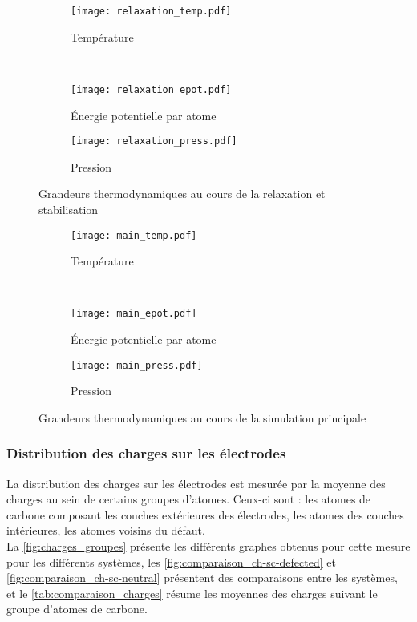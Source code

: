 \begin{figure}[h!]
    \centering
    \begin{subfigure}[t]{.49 \textwidth}
        \centering
        \texttt{[image: relaxation\_temp.pdf]}
        \caption{Température}
    \end{subfigure}%
    ~
    \begin{subfigure}[t]{.49 \textwidth}
        \centering
        \texttt{[image: relaxation\_epot.pdf]}
        \caption{Énergie potentielle par atome}
    \end{subfigure}
    \begin{subfigure}[t]{.49 \textwidth}
        \centering
        \texttt{[image: relaxation\_press.pdf]}
        \caption{Pression}
    \end{subfigure}
    \caption{Grandeurs thermodynamiques au cours de la relaxation et stabilisation}
    \label{fig:relaxation_thermo}
\end{figure}

\begin{figure}[h!]
    \centering
    \begin{subfigure}[t]{.49 \textwidth}
        \centering
        \texttt{[image: main\_temp.pdf]}
        \caption{Température}
    \end{subfigure}%
    ~
    \begin{subfigure}[t]{.49 \textwidth}
        \centering
        \texttt{[image: main\_epot.pdf]}
        \caption{Énergie potentielle par atome}
    \end{subfigure}
    \begin{subfigure}[t]{.49 \textwidth}
        \centering
        \texttt{[image: main\_press.pdf]}
        \caption{Pression}
    \end{subfigure}
    \caption{Grandeurs thermodynamiques au cours de la simulation principale}
    \label{fig:main_thermo}
\end{figure}

    \subsubsection{Distribution des charges sur les électrodes}

La distribution des charges sur les électrodes est mesurée par la moyenne des charges au sein de certains groupes d'atomes. Ceux-ci sont : les atomes de carbone composant les couches extérieures des électrodes, les atomes des couches intérieures, les atomes voisins du défaut.\\
La \autoref{fig:charges_groupes} présente les différents graphes obtenus pour cette mesure pour les différents systèmes, les \autoref{fig:comparaison_ch-sc-defected} et \ref{fig:comparaison_ch-sc-neutral} présentent des comparaisons entre les systèmes, et le \autoref{tab:comparaison_charges} résume les moyennes des charges suivant le groupe d'atomes de carbone.


